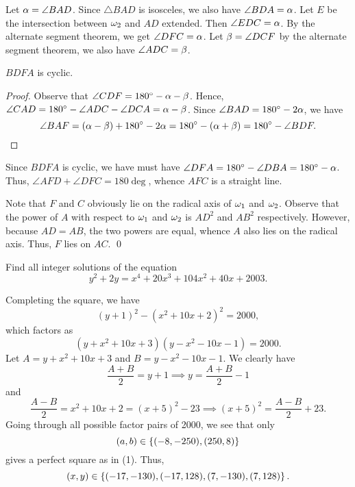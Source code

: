 \begin{solution}
    Let $\alpha = \angle BAD$. Since $\triangle BAD$ is isosceles, we also have $\angle BDA = \alpha$. Let $E$ be the intersection between $\omega_2$ and $AD$ extended. Then $\angle EDC = \alpha$. By the alternate segment theorem, we get $\angle DFC = \alpha$. Let $\beta = \angle DCF$ by the alternate segment theorem, we also have $\angle ADC = \beta$.

    \begin{claim*}
        $BDFA$ is cyclic.
    \end{claim*}
    \begin{proof}
        Observe that $\angle CDF = 180^{\circ} - \alpha - \beta$. Hence, $\angle CAD = 180^{\circ} - \angle ADC - \angle DCA = \alpha - \beta$. Since $\angle BAD = 180^{\circ} - 2\alpha$, we have \[\angle BAF = (\alpha - \beta) + 180^{\circ} - 2\alpha = 180^{\circ} - (\alpha + \beta) = 180^{\circ} - \angle BDF.\]
    \end{proof}
    
    Since $BDFA$ is cyclic, we have must have $\angle DFA = 180^{\circ} - \angle DBA = 180^{\circ} - \alpha$. Thus, $\angle AFD + \angle DFC = 180\deg$, whence $AFC$ is a straight line.
\end{solution}
\begin{solution}[\credit{https://www.youtube.com/watch?v=Mrjm7aWXoNQ}{Way Tan}]
    Note that $F$ and $C$ obviously lie on the radical axis of $\omega_1$ and $\omega_2$. Observe that the power of $A$ with respect to $\omega_1$ and $\omega_2$ is $AD^2$ and $AB^2$ respectively. However, because $AD = AB$, the two powers are equal, whence $A$ also lies on the radical axis. Thus, $F$ lies on $AC$. \qed
\end{solution}

\begin{question}[${(-17, -130), (-17, 128), (7, -130), (7, 128)}$]\label{Q::2024-S-2-2}
    Find all integer solutions of the equation \[y^2 + 2y = x^4 + 20x^3 + 104x^2 + 40x + 2003.\]
\end{question}
\begin{solution*}
    Completing the square, we have \[(y + 1)^2 - (x^2 + 10x + 2)^2 = 2000,\] which factors as \[(y + x^2 + 10x + 3)(y - x^2 - 10x - 1) = 2000.\] Let $A = y + x^2 + 10x + 3$ and $B = y - x^2 - 10x - 1$. We clearly have \[\frac{A + B}{2} = y + 1 \implies y = \frac{A + B}{2} - 1\] and \[\frac{A - B}{2} = x^2 + 10x + 2 = (x+5)^2 - 23 \implies (x+5)^2 = \frac{A-B}{2} + 23 \tag{1}.\] Going through all possible factor pairs of 2000, we see that only \[(a, b) \in \left\lbrace (-8, -250), (250, 8) \right\rbrace\] gives a perfect square as in (1). Thus, \[(x, y) \in \left\lbrace (-17, -130), (-17, 128), (7, -130), (7, 128) \right\rbrace.\]
\end{solution*}

